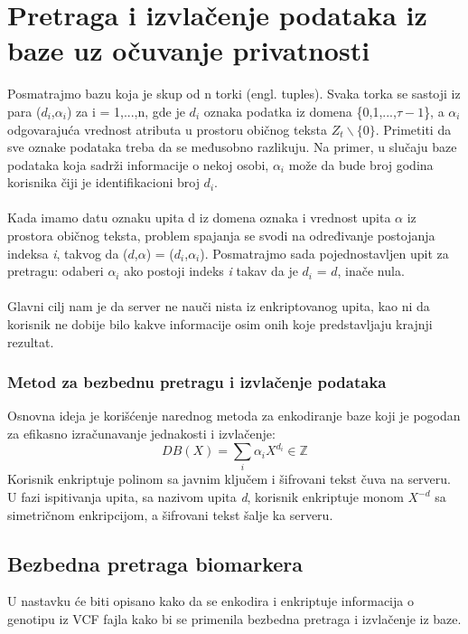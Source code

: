 \documentclass[a4paper]{article}
\begin{document}
\section{Pretraga i izvlačenje podataka iz baze uz očuvanje privatnosti}
Posmatrajmo bazu koja je skup od n torki (engl. tuples). Svaka torka se sastoji iz para ($d_i$,$\alpha_i$) za i = 1,...,n, gde je $d_i$ oznaka podatka iz domena \{0,1,...,$\tau-1$\}, a $\alpha_i$ odgovarajuća vrednost atributa u prostoru običnog teksta $Z_t \backslash \{0\}$. Primetiti da sve oznake podataka treba da se međusobno razlikuju. Na primer, u slučaju baze podataka koja sadrži informacije o nekoj osobi, $\alpha_i$ može da bude broj godina korisnika čiji je identifikacioni broj $d_i$.\\\\
Kada imamo datu oznaku upita d iz domena oznaka i vrednost upita $\alpha$ iz prostora običnog teksta, problem spajanja se svodi na određivanje postojanja indeksa \textit{i}, takvog da ($d$,$\alpha$) = ($d_i$,$\alpha_i$). Posmatrajmo sada pojednostavljen upit za pretragu: odaberi $\alpha_i$ ako postoji indeks \textit{i} takav da je $d_i$ = $d$, inače nula.\\\\
Glavni cilj nam je da server ne nauči nista iz enkriptovanog upita, kao ni da korisnik ne dobije bilo kakve informacije osim onih koje predstavljaju krajnji rezultat.
\subsubsection{Metod za bezbednu pretragu i izvlačenje podataka}
Osnovna ideja je korišćenje narednog metoda za enkodiranje baze koji je pogodan za efikasno izračunavanje jednakosti i izvlačenje:
	$$DB(X) = \sum_{i} \alpha_i X^{d_i} \in \mathbb{Z}$$ 
Korisnik enkriptuje polinom sa javnim ključem i šifrovani tekst čuva na serveru. U fazi ispitivanja upita, sa nazivom upita \textit{d}, korisnik enkriptuje monom $X^{-d}$ sa simetričnom enkripcijom, a šifrovani tekst šalje ka serveru.
\subsection{Bezbedna pretraga biomarkera}
U nastavku će biti opisano kako da se enkodira i enkriptuje informacija o genotipu iz VCF fajla kako bi se primenila bezbedna pretraga i izvlačenje iz baze.
\end{document}
